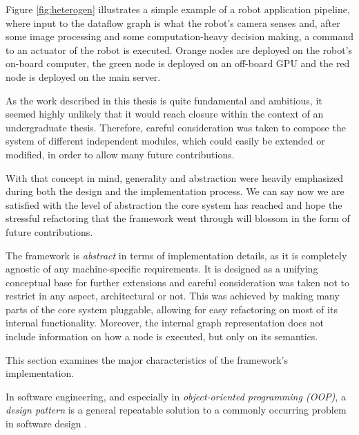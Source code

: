 \documentclass{dithesis}
\begin{document}
Figure \ref{fig:heterogen} illustrates a simple example of a robot application pipeline, where input to the dataflow graph is what the robot's camera senses and, after some image processing and some computation-heavy decision making, a command to an actuator of the robot is executed. Orange nodes are deployed on the robot's on-board computer, the green node is deployed on an off-board GPU and the red node is deployed on the main server.



As the work described in this thesis is quite fundamental and ambitious, it seemed highly unlikely that it would reach closure within the context of an undergraduate thesis. Therefore, careful consideration was taken to compose the system of different independent modules, which could easily be extended or modified, in order to allow many future contributions.

With that concept in mind, generality and abstraction were heavily emphasized during both the design and the implementation process. We can say now we are satisfied with the level of abstraction the core system has reached and hope the stressful refactoring that the framework went through will blossom in the form of future contributions.


The framework is \textit{abstract} in terms of implementation details, as it is completely agnostic of any machine-specific requirements. It is designed as a unifying conceptual base for further extensions and careful consideration was taken not to restrict in any aspect, architectural or not. This was achieved by making many parts of the core system pluggable, allowing for easy refactoring on most of its internal functionality. Moreover, the internal graph representation does not include information on how a node is executed, but only on its semantics.


This section examines the major characteristics of the framework's implementation.


In software engineering, and especially in \textit{object-oriented programming (OOP)}, a \textit{design pattern} is a general repeatable solution to a commonly occurring problem in software design \cite{design}.
\end{document}
